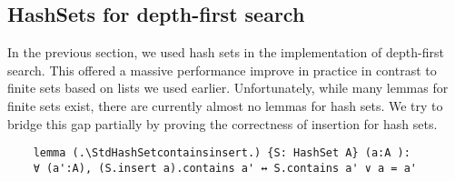 \subsection{HashSets for depth-first search}

In the previous section, we used hash sets in the implementation of depth-first search. This offered a massive performance improve in practice in contrast to finite sets based on lists we used earlier. Unfortunately, while many lemmas for finite sets exist, there are currently almost no lemmas for hash sets. We try to bridge this gap partially by proving the correctness of insertion for hash sets.

\begin{lstlisting}
    lemma (.\StdHashSetcontainsinsert.) {S: HashSet A} (a:A ): 
    ∀ (a':A), (S.insert a).contains a' ↔ S.contains a' ∨ a = a' 

\end{lstlisting}